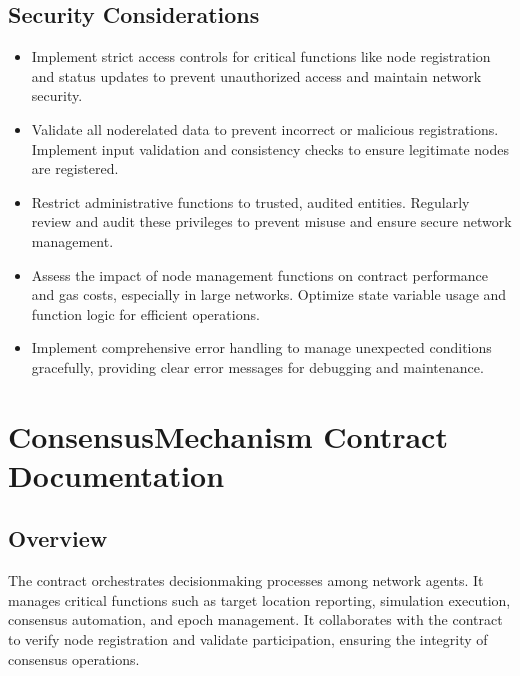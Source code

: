 \documentclass[letterpaper,10pt,english]{sphinxmanual}
\begin{document}
\section{Security Considerations}
\label{\detokenize{docs_node_manager_contract:security-considerations}}\begin{itemize}
\item {} 
\sphinxAtStartPar
{} Implement strict access controls for critical functions like node registration and status updates to prevent unauthorized access and maintain network security.

\item {} 
\sphinxAtStartPar
{} Validate all node\sphinxhyphen{}related data to prevent incorrect or malicious registrations. Implement input validation and consistency checks to ensure legitimate nodes are registered.

\item {} 
\sphinxAtStartPar
{} Restrict administrative functions to trusted, audited entities. Regularly review and audit these privileges to prevent misuse and ensure secure network management.

\item {} 
\sphinxAtStartPar
{} Assess the impact of node management functions on contract performance and gas costs, especially in large networks. Optimize state variable usage and function logic for efficient operations.

\item {} 
\sphinxAtStartPar
{} Implement comprehensive error handling to manage unexpected conditions gracefully, providing clear error messages for debugging and maintenance.

\end{itemize}

\sphinxstepscope


\chapter{ConsensusMechanism Contract Documentation}
\label{\detokenize{docs_consensus_mechanism_contract:consensusmechanism-contract-documentation}}\label{\detokenize{docs_consensus_mechanism_contract::doc}}

\section{Overview}
\label{\detokenize{docs_consensus_mechanism_contract:overview}}
\sphinxAtStartPar
The  contract orchestrates decision\sphinxhyphen{}making processes among network agents. It manages critical functions such as target location reporting, simulation execution, consensus automation, and epoch management. It collaborates with the  contract to verify node registration and validate participation, ensuring the integrity of consensus operations.
\end{document}
